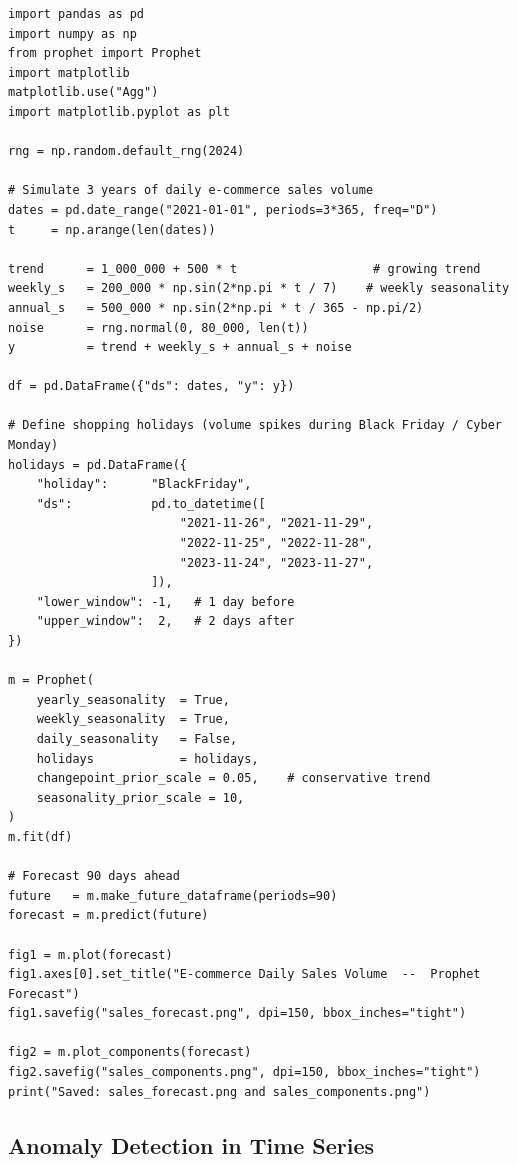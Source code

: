 \begin{lstlisting}[style=pyspark, caption={Prophet on one time series:
  e-commerce daily sales volume with Black Friday holiday effect}]
import pandas as pd
import numpy as np
from prophet import Prophet
import matplotlib
matplotlib.use("Agg")
import matplotlib.pyplot as plt

rng = np.random.default_rng(2024)

# Simulate 3 years of daily e-commerce sales volume
dates = pd.date_range("2021-01-01", periods=3*365, freq="D")
t     = np.arange(len(dates))

trend      = 1_000_000 + 500 * t                   # growing trend
weekly_s   = 200_000 * np.sin(2*np.pi * t / 7)    # weekly seasonality
annual_s   = 500_000 * np.sin(2*np.pi * t / 365 - np.pi/2)
noise      = rng.normal(0, 80_000, len(t))
y          = trend + weekly_s + annual_s + noise

df = pd.DataFrame({"ds": dates, "y": y})

# Define shopping holidays (volume spikes during Black Friday / Cyber Monday)
holidays = pd.DataFrame({
    "holiday":      "BlackFriday",
    "ds":           pd.to_datetime([
                        "2021-11-26", "2021-11-29",
                        "2022-11-25", "2022-11-28",
                        "2023-11-24", "2023-11-27",
                    ]),
    "lower_window": -1,   # 1 day before
    "upper_window":  2,   # 2 days after
})

m = Prophet(
    yearly_seasonality  = True,
    weekly_seasonality  = True,
    daily_seasonality   = False,
    holidays            = holidays,
    changepoint_prior_scale = 0.05,    # conservative trend
    seasonality_prior_scale = 10,
)
m.fit(df)

# Forecast 90 days ahead
future   = m.make_future_dataframe(periods=90)
forecast = m.predict(future)

fig1 = m.plot(forecast)
fig1.axes[0].set_title("E-commerce Daily Sales Volume  --  Prophet Forecast")
fig1.savefig("sales_forecast.png", dpi=150, bbox_inches="tight")

fig2 = m.plot_components(forecast)
fig2.savefig("sales_components.png", dpi=150, bbox_inches="tight")
print("Saved: sales_forecast.png and sales_components.png")
\end{lstlisting}

\subsection{Anomaly Detection in Time Series}
\label{subsec:anomaly}

